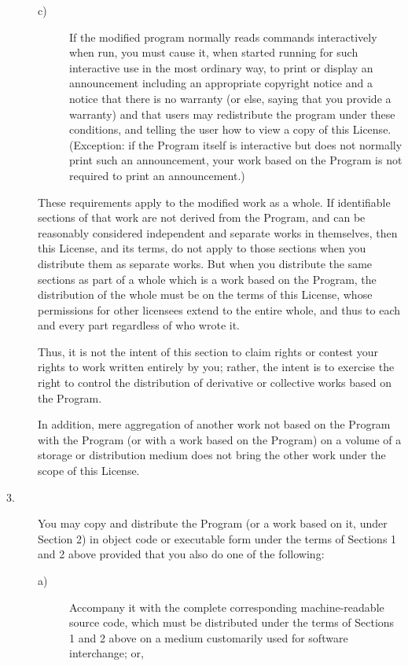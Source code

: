 \begin{description}
\begin{description}
\item[c)] If the modified  program normally reads  commands interactively
when run, you must cause it, when started running for such interactive
use in the most ordinary way, to print or display an announcement
including an appropriate copyright notice and a notice that there is
no warranty (or else, saying that you provide a warranty) and that
users may redistribute the program under these conditions, and telling
the user how to view a copy of this License.  (Exception: if the
Program itself is interactive but does not normally print such an
announcement, your work based on the Program is not required to print
an announcement.)
\end{description}

These requirements apply to the modified work as a whole.  If
identifiable sections of that work are not derived from the Program,
and can be reasonably considered independent and separate works in
themselves, then this License, and its terms, do not apply to those
sections when you distribute them as separate works.  But when you
distribute the same sections as part of a whole which is a work based
on the Program, the distribution of the whole must be on the terms of
this License, whose permissions for other licensees extend to the
entire whole, and thus to each and every part regardless of who wrote
it.

Thus, it is not the intent of this section to claim rights or contest
your rights to work written entirely by you; rather, the intent is to
exercise the right to control the distribution of derivative or
collective works based on the Program.

In addition, mere aggregation of another work not based on the Program
with the Program (or with a work based on the Program) on a volume of
a storage or distribution medium does not bring the other work under
the scope of this License.

\item[3.] You may copy and distribute the  Program (or a  work based on it,
under Section 2) in object code or executable form under the terms of
Sections 1 and 2 above provided that you also do one of the following:

\begin{description}
\item[a)] Accompany it  with the complete  corresponding machine-readable
source code, which must be distributed under the terms of Sections 1
and 2 above on a medium customarily used for software interchange; or,


\end{description}
\end{description}
